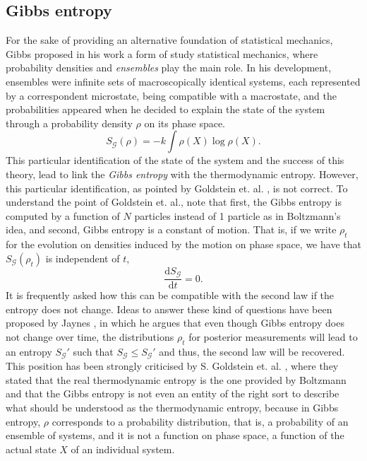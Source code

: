 \subsection{Gibbs entropy}
For the sake of providing an alternative foundation of statistical mechanics, Gibbs proposed in his work \cite{gibbs_elementary_1902} a form of study statistical mechanics, where probability densities and \textit{ensembles} play the main role. In his development, ensembles were infinite sets of macroscopically identical systems, each represented by a correspondent microstate, being compatible with a macrostate, and the probabilities appeared when he decided to explain the state of the system through a probability density $\rho$ on its phase space.
\begin{equation}
S_{\mathcal{G}} (\rho) =-k \int \rho(X) \log\rho(X).
\label{CH1:gibbs_entropy}
\end{equation}
This particular identification of the state of the system and the success of this theory, lead to link the \textit{Gibbs entropy} with the thermodynamic entropy. However, this particular identification, as pointed by Goldstein et. al. \cite{goldstein_boltzmanns_2001, goldstein_gibbs_2020}, is not correct. To understand the point of Goldstein et. al., note that first, the Gibbs entropy is computed by a function of $N$ particles instead of 1 particle as in Boltzmann's idea, and second, Gibbs entropy is a constant of motion. That is, if we write $\rho_t$ for the evolution on densities induced by the motion on phase space, we have that $S_{\mathcal{G}} (\rho_t)$ is independent of $t$, 
\begin{equation}
\frac{\mathrm{d} S_{\mathcal{G}}}{\mathrm{d} t} =0.
\end{equation}
It is frequently asked how this can be compatible with the second law if the entropy does not change. Ideas to answer these kind of questions have been proposed by Jaynes \cite{Jaynes1957InformationTA,doi:10.1119/1.1971557}, in which he argues that even though Gibbs entropy does not change over time, the distributions $\rho_t$ for posterior measurements will lead to an entropy $S_{\mathcal{G}}'$  such that $S_{\mathcal{G}}\leq S_{\mathcal{G}}'$ and thus, the second law will be recovered.
This position has been strongly criticised by S. Goldstein et. al. \cite{goldstein_boltzmanns_2001, goldstein_gibbs_2020}, where they stated that the real thermodynamic entropy is the one provided by Boltzmann and that the Gibbs entropy is not even an entity of the right sort to describe what should be understood as the thermodynamic entropy, because in Gibbs entropy,  $\rho$ corresponds to a probability distribution, that is, a probability of an ensemble of systems, and it is not a function on phase space, a function of the actual state $X$ of an individual system. \\
